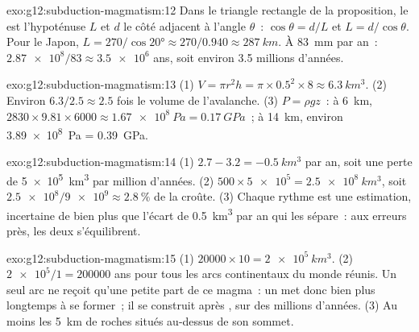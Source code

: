 \begin{solution}{exo:g12:subduction-magmatism:12}
Dans le triangle rectangle de la proposition, le  est l'hypoténuse
$L$ et $d$ le côté adjacent à l'angle $\theta$~: $\cos\theta = d/L$ et $L =
d/\cos\theta$. Pour le Japon, $L = 270/\cos\ang{20} \approx 270/0.940 \approx
\qty{287}{km}$. À \qty{83}{mm} par an~: $\num{2.87e8}/83 \approx \num{3.5e6}$
ans, soit environ 3.5 millions d'années.
\end{solution}

\begin{solution}{exo:g12:subduction-magmatism:13}
(1) $V = \pi r^2 h = \pi \times 0.5^2 \times 8 \approx \qty{6.3}{km^3}$.
(2) Environ $6.3/2.5 \approx 2.5$ fois le volume de l'avalanche.
(3) $P = \rho g z$~: à \qty{6}{km}, $2830 \times 9.81 \times 6000 \approx
\qty{1.67e8}{Pa} = \qty{0.17}{GPa}$~; à \qty{14}{km}, environ
\qty{3.89e8}{Pa} = \qty{0.39}{GPa}.
\end{solution}

\begin{solution}{exo:g12:subduction-magmatism:14}
(1) $2.7 - 3.2 = \qty{-0.5}{km^3}$ par an, soit une perte de
\qty{5e5}{km^3} par million d'années. (2) $500 \times \num{5e5} = \qty{2.5e8}{km^3}$,
soit $\num{2.5e8}/\num{9e9} \approx \qty{2.8}{\percent}$ de la croûte.
(3) Chaque rythme est une estimation, incertaine de bien plus que l'écart
de \qty{0.5}{km^3} par an qui les sépare~: aux erreurs près, les deux
s'équilibrent.
\end{solution}

\begin{solution}{exo:g12:subduction-magmatism:15}
(1) $\num{20000} \times 10 = \qty{2e5}{km^3}$. (2) $\num{2e5}/1 =
\num{200000}$ ans pour tous les arcs continentaux du monde réunis. Un seul
arc ne reçoit qu'une petite part de ce magma~: un  met donc bien
plus longtemps à se former~; il se construit  après , sur des
millions d'années. (3) Au moins les \qty{5}{km} de roches situés au-dessus
de son sommet.
\end{solution}

